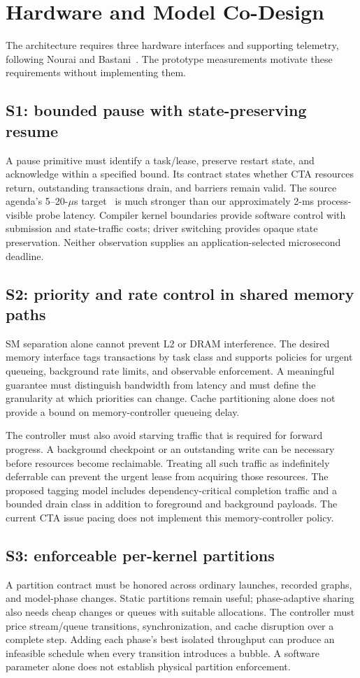 \section{Hardware and Model Co-Design}
\label{sec:hardware}
The architecture requires three hardware interfaces and supporting telemetry,
following Nourai and Bastani~\cite{Nourai2026GPUOS}. The prototype measurements
motivate these requirements without implementing them.

\subsection{S1: bounded pause with state-preserving resume}
A pause primitive must identify a task/lease, preserve restart state, and
acknowledge within a specified bound. Its contract states whether CTA resources
return, outstanding transactions drain, and barriers remain valid. The source
agenda's 5--20-$\mu$s target~\cite{Nourai2026GPUOS} is much stronger than our
approximately 2-ms process-visible probe latency. Compiler kernel boundaries
provide software control with submission and state-traffic costs; driver
switching provides opaque state preservation. Neither observation supplies
an application-selected microsecond deadline.

\subsection{S2: priority and rate control in shared memory paths}
SM separation alone cannot prevent L2 or DRAM interference. The desired
memory interface tags transactions by task class and supports policies for
urgent queueing, background rate limits, and observable enforcement. A
meaningful guarantee must distinguish bandwidth from latency and must define
the granularity at which priorities can change. Cache partitioning alone
does not provide a bound on memory-controller queueing delay.

The controller must also avoid starving traffic that is required for forward
progress. A background checkpoint or an outstanding write can be necessary
before resources become reclaimable. Treating all such traffic as indefinitely
deferrable can prevent the urgent lease from acquiring those resources.
The proposed tagging model includes dependency-critical completion traffic
and a bounded drain class in addition to foreground and background payloads.
The current CTA issue pacing does not implement this memory-controller policy.

\subsection{S3: enforceable per-kernel partitions}
A partition contract must be honored across ordinary launches, recorded
graphs, and model-phase changes. Static partitions remain useful; phase-adaptive
sharing also needs cheap changes or queues with suitable allocations.
The controller must price stream/queue transitions, synchronization, and cache
disruption over a complete step. Adding each phase's best isolated throughput
can produce an infeasible schedule when every transition introduces a bubble.
A software parameter alone does not establish physical partition enforcement.

